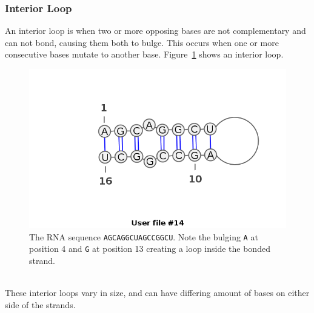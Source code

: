 \subsubsection{Interior Loop}
An interior loop is when two or more opposing bases are not complementary and 
can not bond, causing them both to bulge. This occurs when one or more 
consecutive bases mutate to another base. Figure~\ref{fig:int-loop} shows an interior 
loop.
\begin{figure}[h!]
\centering
\includegraphics[scale=0.4]{./lib/interior-loop.png}
\caption{The RNA sequence {\tt AGCAGGCUAGCCGGCU}. Note the bulging {\tt A} at position 4 and {\tt G} at position 13
creating a loop inside the bonded strand.}
\label{fig:int-loop}
\end{figure}\\
These interior loops vary in size, and can have differing amount of bases on 
either side of the strands.
